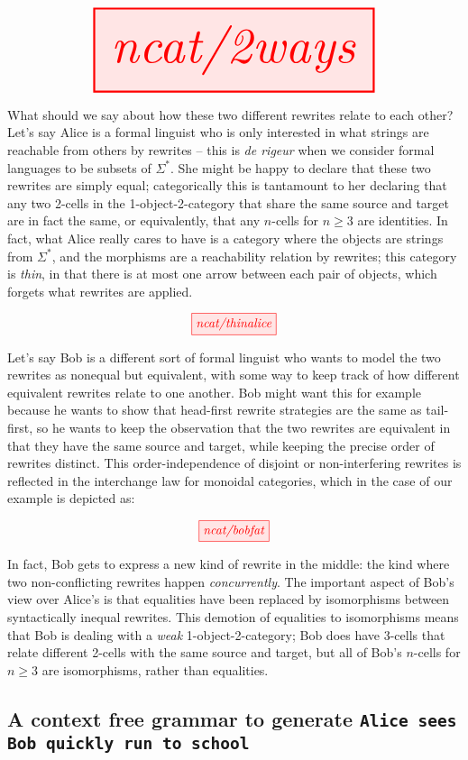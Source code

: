 \[\resizebox{0.8\textwidth}{!}{\tikzfig{ncat/2ways}}\]

What should we say about how these two different rewrites relate to each other? Let's say Alice is a formal linguist who is only interested in what strings are reachable from others by rewrites -- this is \emph{de rigeur} when we consider formal languages to be subsets of $\Sigma^*$. She might be happy to declare that these two rewrites are simply equal; categorically this is tantamount to her declaring that any two 2-cells in the 1-object-2-category that share the same source and target are in fact the same, or equivalently, that any $n$-cells for $n \geq 3$ are identities. In fact, what Alice really cares to have is a category where the objects are strings from $\Sigma^*$, and the morphisms are a reachability relation by rewrites; this category is \emph{thin}, in that there is at most one arrow between each pair of objects, which forgets what rewrites are applied.

\[\tikzfig{ncat/thinalice}\]

Let's say Bob is a different sort of formal linguist who wants to model the two rewrites as nonequal but equivalent, with some way to keep track of how different equivalent rewrites relate to one another. Bob might want this for example because he wants to show that head-first rewrite strategies are the same as tail-first, so he wants to keep the observation that the two rewrites are equivalent in that they have the same source and target, while keeping the precise order of rewrites distinct. This order-independence of disjoint or non-interfering rewrites is reflected in the interchange law for monoidal categories, which in the case of our example is depicted as:

\[\tikzfig{ncat/bobfat}\]

In fact, Bob gets to express a new kind of rewrite in the middle: the kind where two non-conflicting rewrites happen \emph{concurrently}. The important aspect of Bob's view over Alice's is that equalities have been replaced by isomorphisms between syntactically inequal rewrites. This demotion of equalities to isomorphisms means that Bob is dealing with a \emph{weak} 1-object-2-category; Bob does have 3-cells that relate different 2-cells with the same source and target, but all of Bob's $n$-cells for $n \geq 3$ are isomorphisms, rather than equalities.

\subsection{A context free grammar to generate \texttt{Alice sees Bob quickly run to school}}

